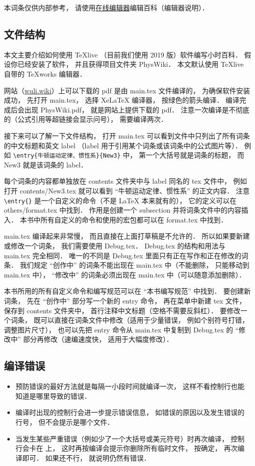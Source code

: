
本词条仅供内部参考， 请使用\href{https://wuli.wiki/editor}{在线编辑器}编辑百科（编辑器说明）．

\subsection{文件结构}

本文主要介绍如何使用 TeXlive （目前我们使用 2019 版）软件编写小时百科． 假设你已经安装了软件， 并且获得项目文件夹 PhysWiki． 本文默认使用 TeXlive 自带的 TeXworks 编辑器．

网站（\href{https://wuli.wiki}{wuli.wiki}）上可以下载的 pdf 是由 main.tex 文件编译的， 为确保软件安装成功， 先打开 main.tex， 选择 XeLaTeX 编译器， 按绿色的箭头编译． 编译完成后会出现 PhysWiki.pdf， 就是网站上提供下载的 pdf． 注意一次编译是不彻底的（公式引用等超链接会显示问号）， 需要编译两次．

接下来可以了解一下文件结构， 打开 main.tex 可以看到文件中只列出了所有词条的中文标题和英文 label （label 用于引用某个词条或该词条中的公式图片等）． 例如 \verb|\entry{牛顿运动定律、惯性系}{New3}| 中， 第一个大括号就是词条的标题， 而 New3 就是该词条的 label．

每个词条的内容都单独放在 contents 文件夹中与 label 同名的 tex 文件中， 例如打开 contents/New3.tex 就可以看到 “牛顿运动定律、惯性系” 的正文内容． 注意 \verb|\entry{}| 是一个自定义的命令（不是 LaTeX 本来就有的）， 它的定义可以在 others/format.tex 中找到． 作用是创建一个 subsection 并将词条文件中的内容插入． 本书中所有自定义的命令和使用的宏包都可以在 format.tex 中找到．

main.tex 编译起来非常慢， 而且直接在上面打草稿是不允许的． 所以如果要新建或修改一个词条， 我们需要使用 Debug.tex． Debug.tex 的结构和用法与 main.tex 完全相同． 唯一的不同是 Debug.tex 里面只有正在写作和正在修改的词条． 我们规定 “创作中” 的词条不能出现在 main.tex 中（不能删除， 只能移动到 main.tex 中）， “修改中” 的词条必须出现在 main.tex 中（可以随意添加删除）．

本书所用的所有自定义命令和编写规范可以在 “本书编写规范” 中找到． 要创建新词条， 先在 “创作中” 部分写一个新的 entry 命令， 再在菜单中新建 tex 文件， 保存到 contents 文件夹中， 首行注释中文标题（空格不需要反斜杠）． 要修改一个词条， 既可以直接在词条文件中修改（适用于少量错误， 例如个别符号打错， 调整图片尺寸）， 也可以先把 entry 命令从 main.tex 中复制到 Debug.tex 的 “修改中” 部分再修改（速编速度快， 适用于大幅度修改）．

\subsection{编译错误}

\begin{itemize}
\item 预防错误的最好方法就是每隔一小段时间就编译一次， 这样不看控制行也能知道是哪里导致的错误．
\item 编译时出现的控制行会进一步提示错误信息， 如错误的原因以及发生错误的行号， 但不会提示是哪个文件．
\item 当发生某些严重错误（例如少了一个大括号或美元符号）时再次编译， 控制行会卡在 \verb|| 上， 这时再按编译会提示你删除所有临时文件， 按确定， 再次编译即可． 如果还不行， 就说明仍然有错误．
\end{itemize}

